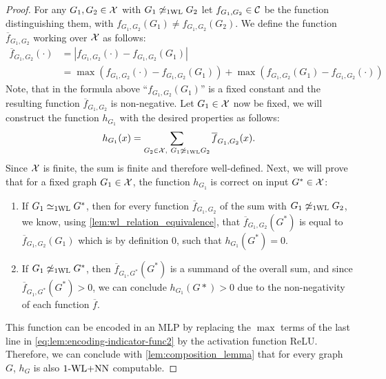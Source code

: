 \begin{proof}
    For any $G_1, G_2 \in \mathcal{X}$ with $G_1 \not\simeq_{\text{1WL}} G_2$ let $f_{G_1, G_2} \in \mathcal{C}$ be the function distinguishing them, with $f_{G_1, G_2}(G_1) \neq f_{G_1, G_2}(G_2)$. We define the function $\overline{f}_{G_1,G_2}$ working over $\mathcal{X}$ as follows:
    \begin{align}\label{eq:lem:encoding-indicator-func2}
        \overline{f}_{G_1, G_2}(\cdot) &= |f_{G_1, G_2}(\cdot) - f_{G_1, G_2}(G_1)| \nonumber \nonumber\\
        &= \max(f_{G_1, G_2}(\cdot) - f_{G_1, G_2}(G_1)) + \max(f_{G_1, G_2}(G_1) - f_{G_1, G_2}(\cdot))
    \end{align}
    Note, that in the formula above ``$f_{G_1, G_2}(G_1)$'' is a fixed constant and the resulting function $\overline{f}_{G_1, G_2}$ is non-negative.
    Let $G_1 \in \mathcal{X}$ now be fixed, we will construct the function $h_{G_1}$ with the desired properties as follows:
    \begin{align*}
        h_{G_1}(x) = \sum_{G_2 \in \mathcal{X}, \ G_1 \not\simeq_{\text{1WL}} G_2} \overline{f}_{G_1, G_2}(x).
    \end{align*}
    Since $\mathcal{X}$ is finite, the sum is finite and therefore well-defined. Next, we will prove that for a fixed graph $G_1 \in \mathcal{X}$, the function $h_{G_1}$ is correct on input $G^* \in \mathcal{X}$:
    \begin{enumerate}
        \item If $G_1 \simeq_{\text{1WL}} G^*$, then for every function $\overline{f}_{G_1, G_2}$ of the sum with $G_1 \not\simeq_{\text{1WL}} G_2$, we know, using \cref{lem:wl_relation_equivalence}, that $\overline{f}_{G_1, G_2}(G^*)$ is equal to $\overline{f}_{G_1, G_2}(G_1)$ which is by definition $0$, such that $h_{G_1}(G^*) = 0$.
        \item If $G_1 \not\simeq_{\text{1WL}} G^*$, then $\overline{f}_{G_1, G^*}(G^*)$ is a summand of the overall sum, and since $\overline{f}_{G_1, G^*}(G^*) > 0$, 
        we can conclude $h_{G_1}(G*) > 0$ due to the non-negativity of each function $\overline{f}$.
    \end{enumerate}

    This function can be encoded in an MLP by replacing the $\max$ terms of the last line in \autoref{eq:lem:encoding-indicator-func2} by the activation function ReLU. Therefore, we can conclude with \cref{lem:composition_lemma} that for every graph $G$, $h_G$ is also $\text{1-WL+NN}$ computable.
\end{proof}

